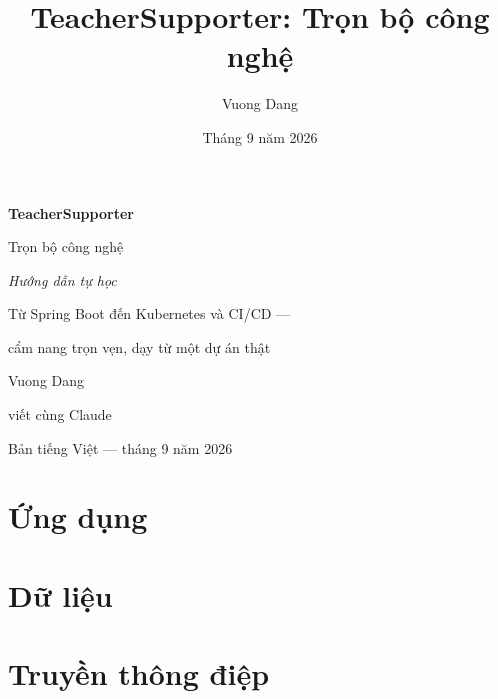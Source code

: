 \documentclass[11pt,twoside,openany]{book}
\title{TeacherSupporter: Trọn bộ công nghệ}
\author{Vuong Dang}
\date{Tháng 9 năm 2026}
\begin{document}
\frontmatter

\begin{titlepage}
  \centering
  \vspace*{1.6in}
  {\Huge\bfseries TeacherSupporter\par}
  \vspace{0.15in}
  {\LARGE Trọn bộ công nghệ\par}
  \vspace{0.1in}
  {\large\itshape Hướng dẫn tự học\par}
  \vspace{0.35in}
  {\large Từ Spring Boot đến Kubernetes và CI/CD ---\par
   cẩm nang trọn vẹn, dạy từ một dự án thật\par}
  \vspace{1.2in}
  {\large Vuong Dang\par}
  \vspace{0.1in}
  {\normalsize viết cùng Claude\par}
  \vfill
  {\small Bản tiếng Việt --- tháng 9 năm 2026 \par}
\end{titlepage}




\tableofcontents

\mainmatter

\part{Ứng dụng}







\part{Dữ liệu}




\part{Truyền thông điệp}


\end{document}
